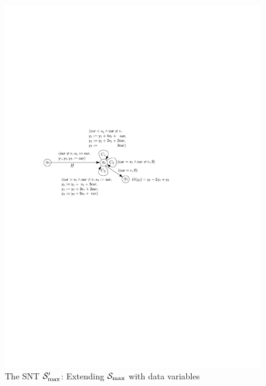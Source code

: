 \begin{example}
\vspace{-2mm}
\begin{figure}[htbp]
\begin{center}
\includegraphics[scale=0.9]{dec-proc-snt-exmp.pdf}
\caption{The SNT ${\mathcal{S} }'_{\max}$: Extending ${\mathcal{S} }_{\max}$ with data variables}\label{fig-dec-proc-snt-exmp}
\end{center}
\end{figure}
%
\end{example}

